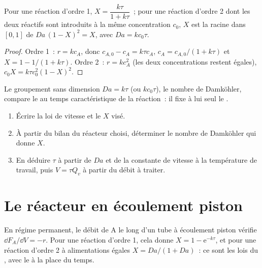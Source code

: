 \begin{theorem}\label{thm:b2:continuous-reactors:cstr}
Pour une réaction d'ordre 1, $X = \dfrac{k\tau}{1 + k\tau}$~; pour une
réaction d'ordre 2 dont les deux réactifs sont introduits à la même concentration $c_0$,
$X$ est la racine dans $[0, 1]$ de $Da\,(1 - X)^2 = X$, avec $Da =
kc_0\tau$.
\end{theorem}

\begin{proof}
Ordre 1~: $r = kc_A$, donc $c_{A,0} - c_A = k\tau c_A$, $c_A = c_{A,0}/(1 + k\tau)$
et $X = 1 - 1/(1 + k\tau)$. Ordre 2~: $r = kc_A^2$ (les deux concentrations restent
égales), $c_0X = k\tau c_0^2(1 - X)^2$.
\end{proof}

Le groupement sans dimension $Da = k\tau$ (ou $kc_0\tau$), le nombre de
Damköhler, compare le  au temps caractéristique de la réaction~:
il fixe à lui seul le .

\begin{method}\label{met:b2:continuous-reactors:size-reactor}
\begin{enumerate}
  \item Écrire la loi de vitesse et le  $X$ visé.
  \item À partir du bilan du réacteur choisi, déterminer le nombre de Damköhler
        qui donne $X$.
  \item En déduire $\tau$ à partir de $Da$ et de la constante de vitesse à la température
        de travail, puis $V = \tau Q_v$ à partir du débit à traiter.
\end{enumerate}
\end{method}

\section{Le réacteur en écoulement piston}

\begin{theorem}\label{thm:b2:continuous-reactors:pfr}
En régime permanent, le débit de A le long d'un tube à écoulement piston vérifie
$\dd F_A/\dd V = -r$. Pour une réaction d'ordre 1, cela donne $X = 1 -
\mathrm e^{-k\tau}$, et pour une réaction d'ordre 2 à alimentations égales $X =
Da/(1 + Da)$~: ce sont les lois du , avec le  à la
place du temps.
\end{theorem}

